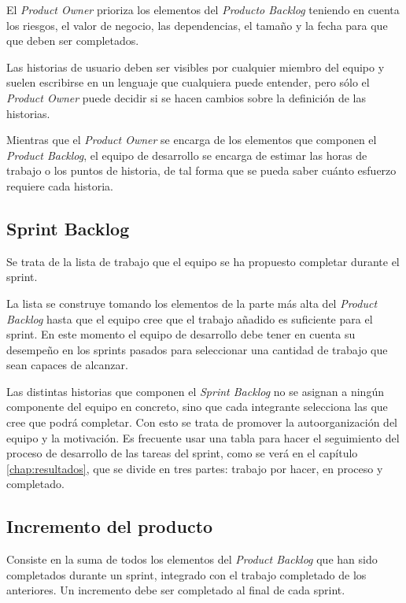 El \emph{Product Owner} prioriza los elementos del \emph{Producto Backlog} teniendo en cuenta los riesgos, el valor de negocio, las dependencias, el tamaño y la fecha para que que deben ser completados.

Las historias de usuario deben ser visibles por cualquier miembro del equipo y suelen escribirse en un lenguaje que cualquiera puede entender, pero sólo el \emph{Product Owner} puede decidir si se hacen cambios sobre la definición de las historias. 

Mientras que el \emph{Product Owner} se encarga de los elementos que componen el \emph{Product Backlog}, el equipo de desarrollo se encarga de estimar las horas de trabajo o los puntos de historia, de tal forma que se pueda saber cuánto esfuerzo requiere cada historia.

\subsection{Sprint Backlog}
\label{sprintBacklog}

Se trata de la lista de trabajo que el equipo se ha propuesto completar durante el sprint.

La lista se construye tomando los elementos de la parte más alta del \emph{Product Backlog} hasta que el equipo cree que el trabajo añadido es suficiente para el sprint. En este momento el equipo de desarrollo debe tener en cuenta su desempeño en los sprints pasados para seleccionar una cantidad de trabajo que sean capaces de alcanzar.

Las distintas historias que componen el \emph{Sprint Backlog} no se asignan a ningún componente del equipo en concreto, sino que cada integrante selecciona las que cree que podrá completar. Con esto se trata de promover la autoorganización del equipo y la motivación. Es frecuente usar una tabla para hacer el seguimiento del proceso de desarrollo de las tareas del sprint, como se verá en el capítulo \ref{chap:resultados}, que se divide en tres partes: trabajo por hacer, en proceso y completado.

\subsection{Incremento del producto}
\label{incremento}

Consiste en la suma de todos los elementos del \emph{Product Backlog} que han sido completados durante un sprint, integrado con el trabajo completado de los anteriores. Un incremento debe ser completado al final de cada sprint.


